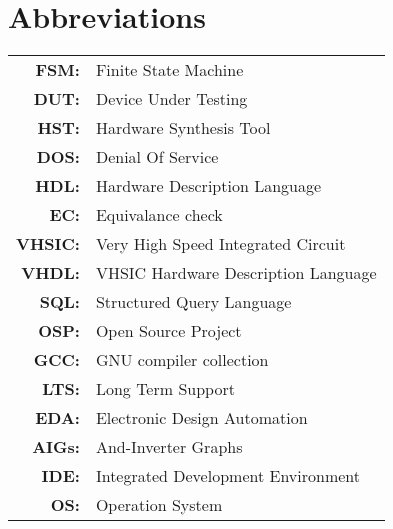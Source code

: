 \renewcommand{\baselinestretch}{1}
\chapter{Abbreviations}

\begin{tabular}{rl}
  \vspace{0.1em} \textbf{FSM:} & Finite State Machine\\
  \vspace{0.1em} \textbf{DUT:} & Device Under Testing \\
  \vspace{0.1em} \textbf{HST:} & Hardware Synthesis Tool\\
  \vspace{0.1em} \textbf{DOS:} & Denial Of Service\\
  \vspace{0.1em} \textbf{HDL:} & Hardware Description Language\\
  \vspace{0.1em} \textbf{EC:} & Equivalance check\\
  \vspace{0.1em} \textbf{VHSIC:} & Very High Speed Integrated Circuit\\
  \vspace{0.1em} \textbf{VHDL:} & VHSIC Hardware Description Language\\
  \vspace{0.1em} \textbf{SQL:} & Structured Query Language\\
  \vspace{0.1em} \textbf{OSP:} & Open Source Project\\
  \vspace{0.1em} \textbf{GCC:} & GNU compiler collection\\
  \vspace{0.1em} \textbf{LTS:} & Long Term Support\\
  \vspace{0.1em} \textbf{EDA:} & Electronic Design Automation\\
  \vspace{0.1em} \textbf{AIGs:} & And-Inverter Graphs\\
  \vspace{0.1em} \textbf{IDE:} & Integrated Development Environment\\
  \vspace{0.1em} \textbf{OS:} & Operation System\\

\end{tabular}
